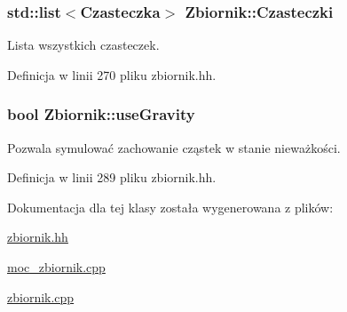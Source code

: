 \hypertarget{class_zbiornik_a751209f2f02a7eaf3b7a3283d8fcd3ad}{}
\subsubsection[{Czasteczki}]{\setlength{\rightskip}{0pt plus 5cm}std\+::list$<${\bf Czasteczka}$>$ Zbiornik\+::\+Czasteczki}\label{class_zbiornik_a751209f2f02a7eaf3b7a3283d8fcd3ad}
Lista wszystkich czasteczek. 

Definicja w linii 270 pliku zbiornik.\+hh.

\hypertarget{class_zbiornik_adf42e0df5f2af3160a1ff2e1360efe8a}{}
\subsubsection[{use\+Gravity}]{\setlength{\rightskip}{0pt plus 5cm}bool Zbiornik\+::use\+Gravity}\label{class_zbiornik_adf42e0df5f2af3160a1ff2e1360efe8a}
Pozwala symulować zachowanie cząstek w stanie nieważkości. 

Definicja w linii 289 pliku zbiornik.\+hh.



Dokumentacja dla tej klasy została wygenerowana z plików\+:\begin{DoxyCompactItemize}
\item 
\hyperlink{zbiornik_8hh}{zbiornik.\+hh}\item 
\hyperlink{moc__zbiornik_8cpp}{moc\+\_\+zbiornik.\+cpp}\item 
\hyperlink{zbiornik_8cpp}{zbiornik.\+cpp}\end{DoxyCompactItemize}
